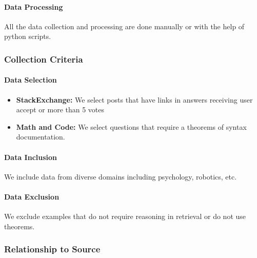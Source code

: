 \paragraph{Data Processing}

All the data collection and processing are done manually or with the help of python scripts.

\subsubsection{Collection Criteria}
\paragraph{Data Selection}
\begin{itemize}
\item \textbf{StackExchange:} We select posts that have links in answers receiving user accept or more than 5 votes
\item  \textbf{Math and Code:} We select questions that require a theorems of syntax documentation.
\end{itemize}

\paragraph{Data Inclusion}
We include data from diverse domains including psychology, robotics, etc.

\paragraph{Data Exclusion}
We exclude examples that do not require reasoning in retrieval or do not use theorems.

\subsubsection{Relationship to Source}
